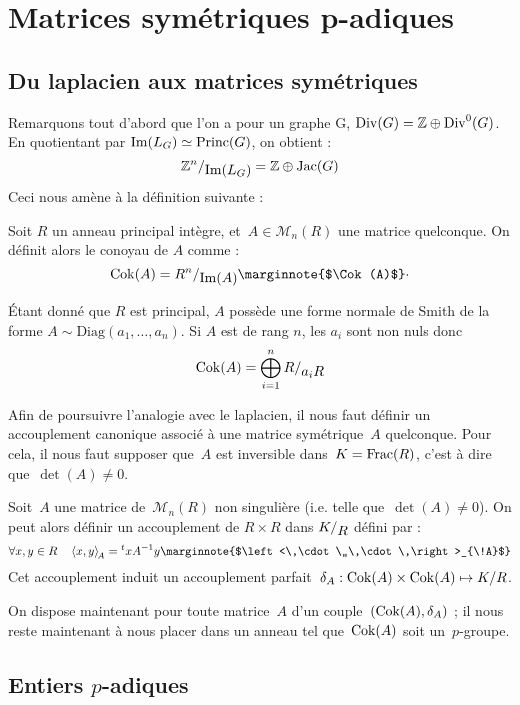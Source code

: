 \section{Matrices symétriques p-adiques}
\subsection{Du laplacien aux matrices symétriques}

Remarquons tout d'abord que l'on a pour un graphe G, $\operatorname{Div}(G) = \mathbb{Z} \oplus \operatorname{Div}^0(G)$. En quotientant par $\operatorname{Im}(L_G) \simeq \operatorname{Princ}(G)$, on obtient : 
\[ 
	\quotient{\mathbb{Z}^n}{\Im(L_G)} = \mathbb{Z} \oplus \Jac(G) 
\]
Ceci nous amène à la définition suivante : 
\begin{defi}
Soit $R$ un anneau principal intègre, et~$A\in\mathcal{M}_n(R)$ une matrice quelconque.
On définit alors le conoyau de $A$ comme : 
\[\Cok(A) = \quotient{R^n}{\Im(A)} \text{\marginnote{$\Cok(A)$}}\cdot\]
\end{defi}

\begin{rem}
\'Etant donné que $R$ est principal, $A$ possède une forme normale de Smith de la forme $A \sim \text{Diag}(a_1,\dots,a_n)$. Si $A$ est de rang $n$, les $a_i$ sont non nuls donc 
\[\Cok(A) = \bigoplus_{i=1}^n{\quotient{R}{a_iR}}\]
\end{rem}

Afin de poursuivre l'analogie avec le laplacien, il nous faut définir un accouplement canonique associé à une matrice symétrique~$A$ quelconque. Pour cela, il nous faut supposer que~$A$ est inversible dans~$K = \operatorname{Frac}(R)$, c'est à dire que~$\det(A)\neq0$.

\begin{defi}
Soit~$A$ une matrice de~$\mathcal{M}_n(R)$ non singulière (i.e. telle que~$\det(A)\neq 0$).
On peut alors définir un accouplement de $R\times R$ dans $\quotient{K}{R}$ défini par :
\[ \forall x,y\in R\quad \left<x,y\right>_{\!A} = {}^txA^{-1}y \text{\marginnote{$\left<\,\cdot\,,\,\cdot\,\right>_{\!A}$}}\]
Cet accouplement induit un accouplement parfait~$\delta_A : \operatorname{Cok}(A)\times\operatorname{Cok}(A) \mapsto K/R$.
\end{defi}

On dispose maintenant pour toute matrice~$A$ d'un couple~$(\operatorname{Cok}(A), \delta_A)$ ; il nous reste maintenant à nous placer dans un anneau tel que~$\operatorname{Cok}(A)$ soit un~$p$-groupe.

\subsection{Entiers $p$-adiques}

